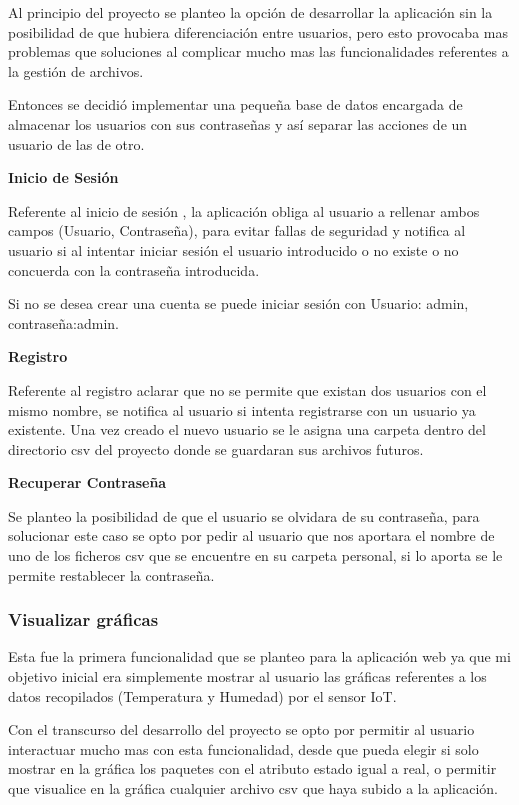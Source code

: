 Al principio del proyecto se planteo la opción de desarrollar la aplicación sin la posibilidad de que hubiera diferenciación entre usuarios, pero esto provocaba mas problemas que soluciones al complicar mucho mas las funcionalidades referentes a la gestión de archivos.

Entonces se decidió implementar una pequeña base de datos encargada de almacenar los usuarios con sus contraseñas y así separar las acciones de un usuario de las de otro.


\textbf{Inicio de Sesión}

Referente al inicio de sesión , la aplicación obliga al usuario a rellenar ambos campos (Usuario, Contraseña), para evitar fallas de seguridad y notifica al usuario si al intentar iniciar sesión el usuario introducido o no existe o no concuerda con la contraseña introducida.

Si no se desea crear una cuenta se puede iniciar sesión con Usuario: admin, contraseña:admin.

\textbf{Registro}

Referente al registro aclarar que no se permite que existan dos usuarios con el mismo nombre, se notifica al usuario si intenta registrarse con un usuario ya existente. Una vez creado el nuevo usuario se le asigna una carpeta dentro del directorio csv del proyecto donde se guardaran sus archivos futuros.

\textbf{Recuperar Contraseña}

Se planteo la posibilidad de que el usuario se olvidara de su contraseña, para solucionar este caso se opto por pedir al usuario que nos aportara el nombre de uno de los ficheros csv que se encuentre en su carpeta personal, si lo aporta se le permite restablecer la contraseña.


\subsubsection{Visualizar gráficas}

Esta fue la primera funcionalidad que se planteo para la aplicación web ya que mi objetivo inicial era simplemente mostrar al usuario las gráficas referentes a los datos recopilados (Temperatura y Humedad) por el sensor IoT.

Con el transcurso del desarrollo del proyecto se opto por permitir al usuario interactuar mucho mas con esta funcionalidad, desde que pueda elegir si solo mostrar en la gráfica los paquetes con el atributo estado igual a real, o permitir que visualice en la gráfica cualquier archivo csv que haya subido a la aplicación.

